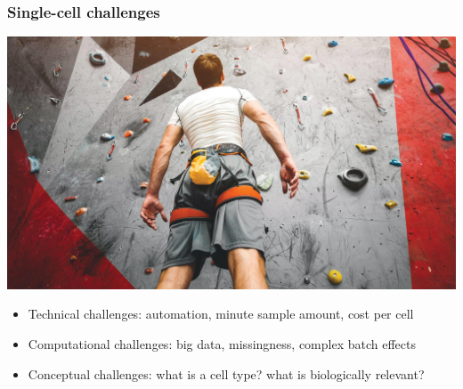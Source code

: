 \documentclass{beamer}
\begin{document}
\begin{frame}[c]
  \frametitle{Single-cell challenges}
  
  \begin{center}
    \includegraphics[width=0.5\linewidth]{figs/climb.jpg}
  \end{center}
  
  \pause
  
  \vfill
  \begin{itemize}
    \item Technical challenges: automation, minute sample amount, cost 
      per cell
    \item Computational challenges: big data, missingness, complex
      batch effects
    \item Conceptual challenges: what is a cell type? what is 
      biologically relevant? 
  \end{itemize}
  
  
\end{frame}
    
\end{document}
